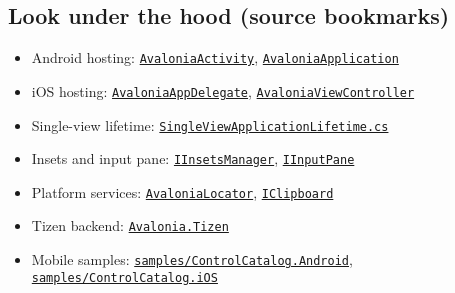 \subsection{Look under the hood (source
bookmarks)}\label{look-under-the-hood-source-bookmarks-17}

\begin{itemize}
\tightlist
\item
  Android hosting:
  \href{https://github.com/AvaloniaUI/Avalonia/blob/master/src/Android/Avalonia.Android/AvaloniaActivity.cs}{\passthrough{\lstinline!AvaloniaActivity!}},
  \href{https://github.com/AvaloniaUI/Avalonia/blob/master/src/Android/Avalonia.Android/AvaloniaApplication.cs}{\passthrough{\lstinline!AvaloniaApplication!}}
\item
  iOS hosting:
  \href{https://github.com/AvaloniaUI/Avalonia/blob/master/src/iOS/Avalonia.iOS/AvaloniaAppDelegate.cs}{\passthrough{\lstinline!AvaloniaAppDelegate!}},
  \href{https://github.com/AvaloniaUI/Avalonia/blob/master/src/iOS/Avalonia.iOS/AvaloniaViewController.cs}{\passthrough{\lstinline!AvaloniaViewController!}}
\item
  Single-view lifetime:
  \href{https://github.com/AvaloniaUI/Avalonia/blob/master/src/Avalonia.Controls/ApplicationLifetimes/SingleViewApplicationLifetime.cs}{\passthrough{\lstinline!SingleViewApplicationLifetime.cs!}}
\item
  Insets and input pane:
  \href{https://github.com/AvaloniaUI/Avalonia/blob/master/src/Avalonia.Controls/Platform/IInsetsManager.cs}{\passthrough{\lstinline!IInsetsManager!}},
  \href{https://github.com/AvaloniaUI/Avalonia/blob/master/src/Avalonia.Controls/Platform/IInputPane.cs}{\passthrough{\lstinline!IInputPane!}}
\item
  Platform services:
  \href{https://github.com/AvaloniaUI/Avalonia/blob/master/src/Avalonia.Base/AvaloniaLocator.cs}{\passthrough{\lstinline!AvaloniaLocator!}},
  \href{https://github.com/AvaloniaUI/Avalonia/blob/master/src/Avalonia.Input/IClipboard.cs}{\passthrough{\lstinline!IClipboard!}}
\item
  Tizen backend:
  \href{https://github.com/AvaloniaUI/Avalonia/tree/master/src/Tizen}{\passthrough{\lstinline!Avalonia.Tizen!}}
\item
  Mobile samples:
  \href{https://github.com/AvaloniaUI/Avalonia/tree/master/samples/ControlCatalog.Android}{\passthrough{\lstinline!samples/ControlCatalog.Android!}},
  \href{https://github.com/AvaloniaUI/Avalonia/tree/master/samples/ControlCatalog.iOS}{\passthrough{\lstinline!samples/ControlCatalog.iOS!}}
\end{itemize}

